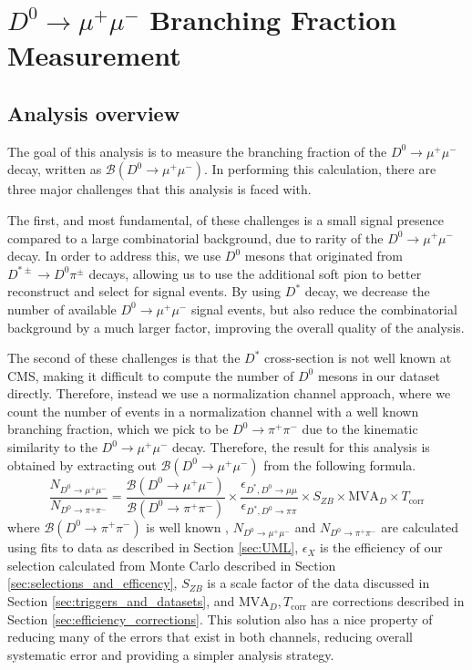 \chapter{$D^0 \to \mu^+\mu^-$ Branching Fraction Measurement}
\label{ch:4}

\section{Analysis overview}

\label{sec:analysis_overview}

The goal of this analysis is to measure the branching fraction of the $D^0 \to \mu^+ \mu^-$ decay, written as $\mathcal{B}(D^0 \to \mu^+ \mu^-)$. In performing this calculation, there are three major challenges that this analysis is faced with. 

The first, and most fundamental, of these challenges is a small signal presence compared to a large combinatorial background, due to rarity of the $D^0 \to \mu^+ \mu^-$ decay. In order to address this, we use $D^0$ mesons that originated from $D^{*\pm} \to D^0 \pi^\pm$ decays, allowing us to use the additional soft pion to better reconstruct and select for signal events. By using $D^*$ decay, we decrease the number of available $D^0 \to \mu^+ \mu^-$ signal events, but also reduce the combinatorial background by a much larger factor, improving the overall quality of the analysis. 

The second of these challenges is that the $D^*$ cross-section is not well known at CMS, making it difficult to compute the number of $D^0$ mesons in our dataset directly. Therefore, instead we use a normalization channel approach, where we count the number of events in a normalization channel with a well known branching fraction, which we pick to be $D^0 \to \pi^+ \pi^-$ due to the kinematic similarity to the $D^0 \to \mu^+ \mu^-$ decay. Therefore, the result for this analysis is obtained by extracting out $\mathcal{B}(D^0 \to \mu^+ \mu^-)$ from the following formula.
\begin{equation}
    \frac{N_{D^0 \to \mu^+  \mu^-}}{N_{D^0 \to \pi^+ \pi^-}} = \frac{\mathcal{B}(D^0 \to \mu^+ \mu^-)}{\mathcal{B}(D^0 \to \pi^+ \pi^-)}\times \frac{\epsilon_{D^*, D^0\to\mu\mu}}{\epsilon_{D^*, D^0\to\pi\pi}} \times S_{ZB} \times \text{MVA}_D \times T_{\text{corr}} 
\label{eq:main_analysis}
\end{equation}
where $\mathcal{B}(D^0 \to \pi^+ \pi^-)$ is well known \cite{ref:pdg2024}, $N_{D^0 \to \mu^+  \mu^-}$ and $N_{D^0 \to \pi^+ \pi^-}$ are calculated using fits to data as described in Section \ref{sec:UML}, $\epsilon_X$ is the efficiency of our selection calculated from Monte Carlo described in Section \ref{sec:selections_and_efficency}, $S_{ZB}$ is a scale factor of the data discussed in Section \ref{sec:triggers_and_datasets}, and $\text{MVA}_D,T_{\text{corr}}$ are corrections described in Section \ref{sec:efficiency_corrections}. This solution also has a nice property of reducing many of the errors that exist in both channels, reducing overall systematic error and providing a simpler analysis strategy.

